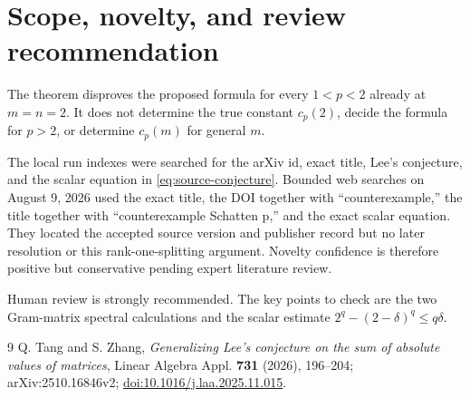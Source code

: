 \documentclass[11pt]{article}
\begin{document}
\section{Scope, novelty, and review recommendation}

The theorem disproves the proposed formula for every $1<p<2$ already at
$m=n=2$.  It does not determine the true constant $c_p(2)$, decide the
formula for $p>2$, or determine $c_p(m)$ for general $m$.

The local run indexes were searched for the arXiv id, exact title, Lee's
conjecture, and the scalar equation in \eqref{eq:source-conjecture}.  Bounded
web searches on August 9, 2026 used the exact title, the DOI together with
``counterexample,'' the title together with ``counterexample Schatten p,''
and the exact scalar equation.  They located the accepted source version and
publisher record but no later resolution or this rank-one-splitting argument.
Novelty confidence is therefore positive but conservative pending expert
literature review.

Human review is strongly recommended.  The key points to check are the two
Gram-matrix spectral calculations and the scalar estimate
$2^q-(2-\delta)^q\le q\delta$.

\begin{thebibliography}{9}
Q. Tang and S. Zhang,
\emph{Generalizing Lee's conjecture on the sum of absolute values of matrices},
Linear Algebra Appl. \textbf{731} (2026), 196--204;
arXiv:2510.16846v2;
\href{https://doi.org/10.1016/j.laa.2025.11.015}{doi:10.1016/j.laa.2025.11.015}.
\end{thebibliography}
\end{document}
